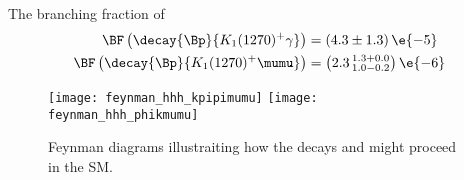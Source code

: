 The branching fraction of 
\begin{align}
  \BF\left(\decay{\Bp}{K_1(1270)^+\gamma}\right) &= \left(4.3\pm1.3\right)\e{-5} \\
  \BF\left(\decay{\Bp}{K_1(1270)^+\mumu}\right) &= \left(2.3\,^{1.3+0.0}_{1.0-0.2}\right)\e{-6}
\end{align}


\begin{figure}
  \begin{center}
    \texttt{[image: feynman\_hhh\_kpipimumu]}
    \texttt{[image: feynman\_hhh\_phikmumu]}
    \caption[Feynman diagrams for \btokpipimumu and \btophikmumu]{\small
      Feynman diagrams illustraiting how the decays \btokpipimumu and \btophikmumu might proceed in
      the SM.
    }
    \label{fig:hhh:feyn}
  \end{center}
\end{figure}


